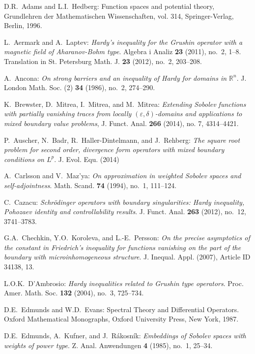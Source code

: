 \documentclass[10pt,leqno]{amsart}
\theoremstyle{definition}
\numberwithin{equation}{section}
\begin{document}
\begin{thebibliography}{11}

D.R.~Adams and L.I.~Hedberg:
Function spaces and potential theory,
Grundlehren der Mathematischen Wissenschaften, vol. 314, Springer-Verlag,
Berlin, 1996.

L.~Aermark and A.~Laptev: \emph{Hardy's inequality for the Grushin operator
with a magnetic field of Aharanov-Bohm type}. Algebra i Analiz {\bf 23} (2011),
no.~2, 1--8. Translation in St. Petersburg Math. J. {\bf 23} (2012), no.~2,
203--208. 

A.~Ancona: \emph{On strong barriers and an inequality of Hardy for domains in
${{\mathbb R}}^n$}. J. London Math. Soc. (2) {\bf 34} (1986), no.~2, 274--290.

K.~Brewster, D.~Mitrea, I.~Mitrea, and M.~Mitrea: \emph{Extending Sobolev
functions with partially vanishing traces from locally
$(\varepsilon,\delta)$-domains and applications to mixed boundary value
problems}, J. Funct. Anal. {\bf 266} (2014), no. 7, 4314--4421.

P.~Auscher, N.~Badr, R.~Haller-Dintelmann, and J.~Rehberg: 
\emph{The square root problem for second order, divergence form operators with
mixed boundary conditions on $L^p$}. J. Evol. Equ. (2014)

A.~Carlsson and V.~Maz'ya: \emph{On approximation in weighted Sobolev spaces and
self-adjointness}. Math. Scand. {\bf 74} (1994), no.~1, 111--124.
    
C.~Cazacu: \emph{Schr\"odinger operators with boundary singularities: Hardy
inequality, Pohozaev identity and controllability results}. J. Funct. Anal.
{\bf 263} (2012), no.~12, 3741--3783.

G.A.~Chechkin, Y.O.~Koroleva, and L.-E.~Persson: \emph{On the precise
asymptotics of the constant in Friedrich's inequality for functions vanishing
on the part of the boundary with microinhomogeneous structure}. J. Inequal.
Appl. (2007), Article ID 34138, 13.

L.O.K.~D'Ambrosio: \emph{Hardy inequalities related to Grushin type operators}.
Proc. Amer. Math. Soc. {\bf 132} (2004), no.~3, 725--734.

D.E.~Edmunds and W.D.~Evans: Spectral Theory and Differential Operators.
Oxford Mathematical Monographs, Oxford University Press, New York,
1987.

D.E.~Edmunds, A.~Kufner, and J.~R{\'a}kosn{\'{i}}k: \emph{Embeddings of
{S}obolev spaces with weights of power type}. Z. Anal. Anwendungen {\bf 4}
(1985), no.~1, 25--34.


\end{thebibliography}
\end{document}
